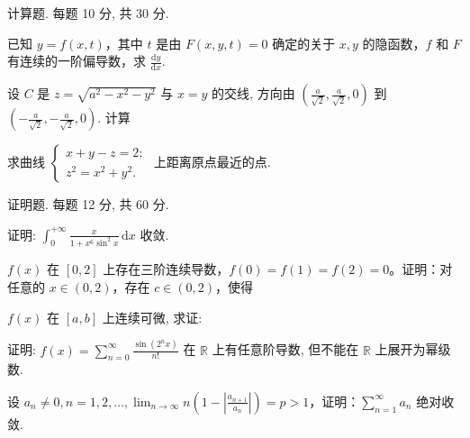 计算题. 每题 10 分, 共 30 分.\par
已知 $y = f(x, t)$，其中 $t$ 是由 $F(x, y, t) = 0$ 确定的关于 $x, y$ 的隐函数，$f$ 和 $F$ 有连续的一阶偏导数，求 $\frac{\mathrm{d}y}{\mathrm{d}x}$.\par
\par{}
设 $C$ 是 $z = \sqrt{a^2 - x^2 - y^2}$ 与 $x = y$ 的交线, 方向由 $\left(\frac{a}{\sqrt{2}}, \frac{a}{\sqrt{2}}, 0\right)$ 到 $\left(-\frac{a}{\sqrt{2}}, -\frac{a}{\sqrt{2}}, 0\right)$. 计算\par
\nopagebreak[4]
求曲线  $\left\{\begin{aligned}x+y-z=2;\\ z^{2}=x^{2}+y^{2}.\end{aligned}\right.$  上距离原点最近的点.\par
\par{}
证明题. 每题 12 分, 共 60 分.\par
证明: $\int_{0}^{+\infty} \frac{x}{1 + x^{6} \sin^{2} x} \, \mathrm{d}x$ 收敛.\par
\par{}
$f(x)$ 在 $[0,2]$ 上存在三阶连续导数，$f(0) = f(1) = f(2) = 0$。证明：对任意的 $x \in (0,2)$，存在 $c \in (0,2)$，使得\par
\nopagebreak[4]
\par{}
$f(x)$ 在 $[a, b]$ 上连续可微, 求证:\par
\nopagebreak[4]
证明: $f(x) = \sum_{n=0}^{\infty} \frac{\sin(2^n x)}{n!}$ 在 $\mathbb{R}$ 上有任意阶导数, 但不能在 $\mathbb{R}$ 上展开为幂级数.\par
设 $a_{n} \neq 0, n = 1,2,\dots, \lim_{n\to \infty}n\left(1 - \left|\frac{a_{n + 1}}{a_n}\right|\right) = p > 1$，证明：$\sum_{n=1}^{\infty} a_{n}$ 绝对收敛.\par
